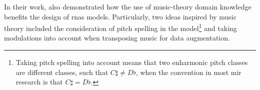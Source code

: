 

In their work, \textcite{micchi2020not} also demonstrated
how the use of music-theory domain knowledge benefits the
design of \glspl{rna} models.
Particularly, two ideas inspired by music theory included
the consideration of pitch spelling in the
model\footnote{Taking pitch spelling into account means that
two enharmonic pitch classes are different classes, such
that $C\sharp \neq D\flat$, when the convention in most \gls{mir}
research is that $C\sharp = D\flat$.} and taking modulations
into account when transposing music for data augmentation.
